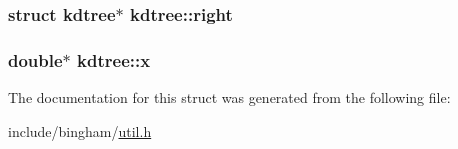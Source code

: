 \label{structkdtree_aea8386a2f0d15772aad52cb12f14b195}
\hypertarget{structkdtree_aeff4c4ef599811a65674ab2a1eb49f6f}{
\subsubsection[{right}]{\setlength{\rightskip}{0pt plus 5cm}struct {\bf kdtree}$\ast$ {\bf kdtree::right}}}
\label{structkdtree_aeff4c4ef599811a65674ab2a1eb49f6f}
\hypertarget{structkdtree_a08dfd21f2dd52dcffe4ebca4db65636f}{
\subsubsection[{x}]{\setlength{\rightskip}{0pt plus 5cm}double$\ast$ {\bf kdtree::x}}}
\label{structkdtree_a08dfd21f2dd52dcffe4ebca4db65636f}


The documentation for this struct was generated from the following file:\begin{DoxyCompactItemize}
\item 
include/bingham/\hyperlink{util_8h}{util.h}\end{DoxyCompactItemize}
